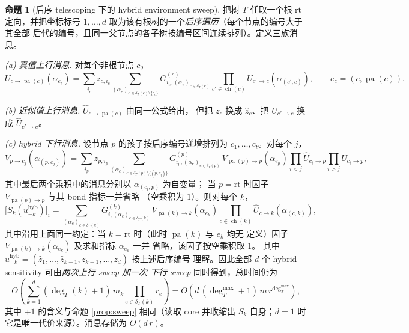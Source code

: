 \documentclass[a4paper,11pt]{article}
\theoremstyle{definition}
\newtheorem{proposition}{命题}
\newcommand{\1}{\mathbf 1}
\newcommand{\pa}{\operatorname{pa}}
\newcommand{\ch}{\operatorname{ch}}
\begin{document}
\begin{proposition}[后序 telescoping 下的 hybrid environment sweep]
\label{prop:hybsweep}
把树 $T$ 任取一个根 $\mathrm{rt}$ 定向，并把坐标标号
$1,\ldots,d$ 取为该有根树的一个\emph{后序遍历}（每个节点的编号大于其全部
后代的编号，且同一父节点的各子树按编号区间连续排列）。定义三族消息。

\emph{(a) 真值上行消息.} 对每个非根节点 $c$，
\[
U_{c\to\pa(c)}(\alpha_{e_c})
=
\sum_{i_c}z_{c,i_c}
\sum_{(\alpha_e)_{e\in\delta_T(c)\setminus\{e_c\}}}
G^{(c)}_{i_c,(\alpha_e)_{e\in\delta_T(c)}}
\prod_{c'\in\ch(c)}U_{c'\to c}(\alpha_{(c',c)}),
\qquad e_c=(c,\pa(c)).
\]

\emph{(b) 近似值上行消息.} $\widehat U_{c\to\pa(c)}$ 由同一公式给出，
但把 $z_{c}$ 换成 $\widehat z_{c}$、把 $U_{c'\to c}$ 换成
$\widehat U_{c'\to c}$。

\emph{(c) hybrid 下行消息.} 设节点 $p$ 的孩子按后序编号递增排列为
$c_1,\ldots,c_t$。对每个 $j$，
\[
V_{p\to c_j}(\alpha_{(p,c_j)})
=
\sum_{i_p}z_{p,i_p}
\!\!\!\sum_{(\alpha_e)_{e\in\delta_T(p)\setminus\{(p,c_j)\}}}\!\!\!
G^{(p)}_{i_p,(\alpha_e)_{e\in\delta_T(p)}}
\,
V_{\pa(p)\to p}(\alpha_{e_p})
\!\!\prod_{i<j}\!\widehat U_{c_i\to p}
\!\!\prod_{i>j}\!U_{c_i\to p},
\]
其中最后两个乘积中的消息分别以 $\alpha_{(c_i,p)}$ 为自变量；
当 $p=\mathrm{rt}$ 时因子 $V_{\pa(p)\to p}$ 与其 bond 指标一并省略
（空乘积为 $1$）。则对每个 $k$，
\[
\bigl[S_k(u_{-k}^{\mathrm{hyb}})\bigr]_i
=
\sum_{(\alpha_e)_{e\in\delta_T(k)}}
G^{(k)}_{i,(\alpha_e)_{e\in\delta_T(k)}}
\,
V_{\pa(k)\to k}(\alpha_{e_k})
\prod_{c\in\ch(k)}\widehat U_{c\to k}(\alpha_{(c,k)}),
\]
其中沿用上面同一约定：当 $k=\mathrm{rt}$ 时（此时 $\pa(k)$ 与 $e_k$ 均无
定义）因子 $V_{\pa(k)\to k}(\alpha_{e_k})$ 及求和指标 $\alpha_{e_k}$ 一并
省略，该因子按空乘积取 $1$。
其中 $u_{-k}^{\mathrm{hyb}}
=(\widehat z_1,\ldots,\widehat z_{k-1},z_{k+1},\ldots,z_d)$ 按上述后序编号
理解。因此全部 $d$ 个 hybrid sensitivity 可由\emph{两次上行 sweep 加一次
下行 sweep} 同时得到，总时间仍为
\[
O\!\left(\sum_{k=1}^{d}(\deg_T(k)+1)\,m_k\prod_{e\in\delta_T(k)}r_e\right)
=
O\!\left(d\,(\deg_T^{\max}+1)\,m\,r^{\deg_T^{\max}}\right),
\]
其中 $+1$ 的含义与命题 \ref{prop:sweep} 相同（读取 core 并收缩出
$S_k$ 自身；$d=1$ 时它是唯一代价来源）。消息存储为 $O(d\,r)$。
\end{proposition}
\end{document}
